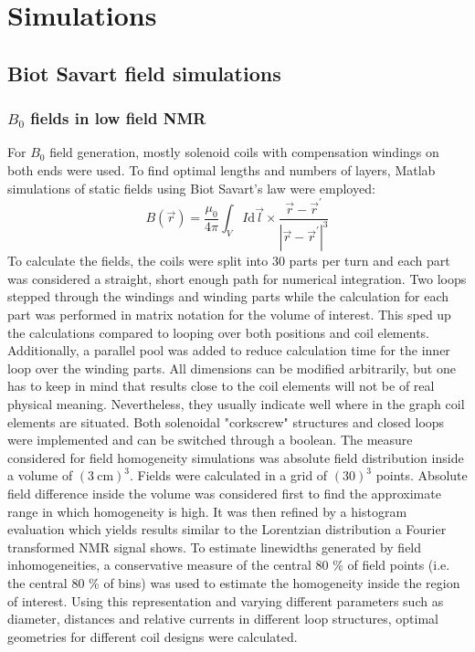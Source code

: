\chapter{Simulations}\label{chapter:simulations}
\section{Biot Savart field simulations}
\subsection{$B_0$ fields in low field NMR}\label{simulations:B0}
\label{sec:simulations:B0sim}
        For $B_0$ field generation, mostly solenoid coils with compensation windings on both ends were used. To find optimal lengths and numbers of layers, Matlab simulations of static fields using Biot Savart's law were employed:
        \begin{equation}
            B(\vec r) = \frac{\mu_0}{4\pi} \int_V I\mathrm{d} \vec l \times \frac{\vec r - \vec r^{'}}{\left|\vec r - \vec r^{'}\right|^3}
        \end{equation}
        To calculate the fields, the coils were split into 30 parts per turn and each part was considered a straight, short enough path for numerical integration. Two loops stepped through the windings and winding parts while the calculation for each part was performed in matrix notation for the volume of interest. This sped up the calculations compared to looping over both positions and coil elements. Additionally, a parallel pool was added to reduce calculation time for the inner loop over the winding parts.
        All dimensions can be modified arbitrarily, but one has to keep in mind that results close to the coil elements will not be of real physical meaning. Nevertheless, they usually indicate well where in the graph coil elements are situated.  Both solenoidal "corkscrew" structures and closed loops were implemented and can be switched through a boolean. The measure considered for field homogeneity simulations was absolute field distribution inside a volume of $(\SI{3}{\centi\meter})^3$. Fields were calculated in a grid of $(30)^3$ points. Absolute field difference inside the volume was considered first to find the approximate range in which homogeneity is high. It was then refined by a histogram evaluation which yields results similar to the Lorentzian distribution a Fourier transformed NMR signal shows. To estimate linewidths generated by field inhomogeneities, a conservative measure of the central 80 \% of field points (i.e. the central 80 \% of bins) was used to estimate the homogeneity inside the region of interest.  Using this representation and varying different parameters such as diameter, distances and relative currents in different loop structures, optimal geometries for different coil designs were calculated.

